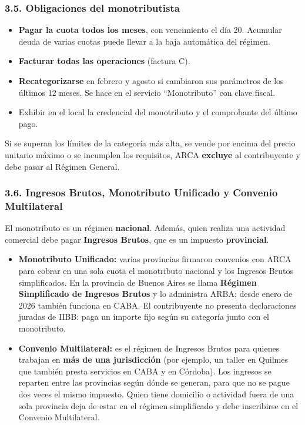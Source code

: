 \subsubsection*{3.5. Obligaciones del monotributista}
\begin{itemize}
  \item \textbf{Pagar la cuota todos los meses}, con vencimiento el día 20. Acumular deuda
        de varias cuotas puede llevar a la baja automática del régimen.
  \item \textbf{Facturar todas las operaciones} (factura C).
  \item \textbf{Recategorizarse} en febrero y agosto si cambiaron sus parámetros de los
        últimos 12 meses. Se hace en el servicio ``Monotributo'' con clave fiscal.
  \item Exhibir en el local la credencial del monotributo y el comprobante del último pago.
\end{itemize}
Si se superan los límites de la categoría más alta, se vende por encima del precio unitario
máximo o se incumplen los requisitos, ARCA \textbf{excluye} al contribuyente y debe pasar al
Régimen General.

\subsubsection*{3.6. Ingresos Brutos, Monotributo Unificado y Convenio Multilateral}
El monotributo es un régimen \textbf{nacional}. Además, quien realiza una actividad
comercial debe pagar \textbf{Ingresos Brutos}, que es un impuesto \textbf{provincial}.
\begin{itemize}
  \item \textbf{Monotributo Unificado:} varias provincias firmaron convenios con ARCA para
        cobrar en una sola cuota el monotributo nacional y los Ingresos Brutos simplificados.
        En la provincia de Buenos Aires se llama \textbf{Régimen Simplificado de Ingresos
        Brutos} y lo administra ARBA; desde enero de 2026 también funciona en CABA. El
        contribuyente no presenta declaraciones juradas de IIBB: paga un importe fijo según
        su categoría junto con el monotributo.
  \item \textbf{Convenio Multilateral:} es el régimen de Ingresos Brutos para quienes
        trabajan en \textbf{más de una jurisdicción} (por ejemplo, un taller en Quilmes que
        también presta servicios en CABA y en Córdoba). Los ingresos se reparten entre las
        provincias según dónde se generan, para que no se pague dos veces el mismo impuesto.
        Quien tiene domicilio o actividad fuera de una sola provincia deja de estar en el
        régimen simplificado y debe inscribirse en el Convenio Multilateral.
\end{itemize}

